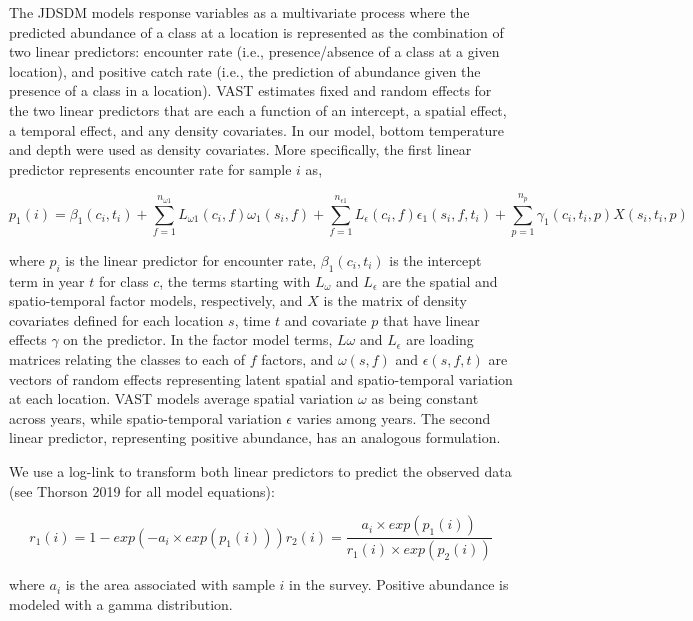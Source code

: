 \documentclass[11pt,]{article}
\begin{document}
The JDSDM models response variables as a multivariate process where the predicted abundance of a class at a location is represented as the combination of two linear predictors: encounter rate (i.e., presence/absence of a class at a given location), and positive catch rate (i.e., the prediction of abundance given the presence of a class in a location). VAST estimates fixed and random effects for the two linear predictors that are each a function of an intercept, a spatial effect, a temporal effect, and any density covariates. In our model, bottom temperature and depth were used as density covariates. More specifically, the first linear predictor represents encounter rate for sample \(i\) as,

\begin{equation}
  p_1(i)=\beta_1(c_i,t_i)+\sum_{f=1}^{n_{\omega1}}L_{\omega1}(c_i,f)\omega_1(s_i,f)+\sum_{f=1}^{n_{\epsilon1}}L_{\epsilon}(c_i,f)\epsilon_1(s_i,f,t_i)+\sum_{p=1}^{n_p}\gamma_1(c_i,t_i,p)X(s_i,t_i,p)
  \label{eq:linpred}
\end{equation}

where \(p_i\) is the linear predictor for encounter rate, \(\beta_1(c_i,t_i)\) is the intercept term in year \(t\) for class \(c\), the terms starting with \(L_\omega\) and \(L_\epsilon\) are the spatial and spatio-temporal factor models, respectively, and \(X\) is the matrix of density covariates defined for each location \(s\), time \(t\) and covariate \(p\) that have linear effects \(\gamma\) on the predictor. In the factor model terms, \(L\omega\) and \(L_\epsilon\) are loading matrices relating the classes to each of \(f\) factors, and \(\omega(s,f)\) and \(\epsilon(s,f,t)\) are vectors of random effects representing latent spatial and spatio-temporal variation at each location. VAST models average spatial variation \(\omega\) as being constant across years, while spatio-temporal variation \(\epsilon\) varies among years. The second linear predictor, representing positive abundance, has an analogous formulation.

We use a log-link to transform both linear predictors to predict the observed data (see Thorson 2019 for all model equations):

\begin{equation}
  r_1(i) = 1-exp(-a_i\times exp(p_1(i)))
  r_2(i) = \frac{a_i\times exp(p_1(i))}{r_1(i)\times exp(p_2(i))}
  \label{eq:transpred}
\end{equation}

where \(a_i\) is the area associated with sample \(i\) in the survey. Positive abundance is modeled with a gamma distribution.
\end{document}
